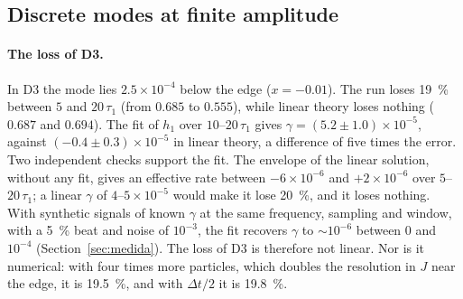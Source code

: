 \documentclass[11pt,a4paper]{article}
\begin{document}
\subsection{Discrete modes at finite amplitude}
\label{sec:res_discreto}

\paragraph{The loss of D3.} In D3 the mode lies $2.5\times10^{-4}$ below the edge
($x=-0.01$). The run loses \SI{19}{\%} between $5$ and $20\,\tau_1$ (from $0.685$ to
$0.555$), while linear theory loses nothing ($0.687$ and $0.694$). The fit of $h_1$ over
$10$--$20\,\tau_1$ gives $\gamma=(5.2\pm1.0)\times10^{-5}$, against $(-0.4\pm0.3)\times10^{-5}$ in
linear theory, a difference of five times the error. Two independent checks support the
fit. The envelope of the linear solution, without any fit, gives an effective rate
between $-6\times10^{-6}$ and $+2\times10^{-6}$ over $5$--$20\,\tau_1$; a linear $\gamma$ of
$4$--$5\times10^{-5}$ would make it lose \SI{20}{\%}, and it loses nothing. With synthetic
signals of known $\gamma$ at the same frequency, sampling and window, with a
\SI{5}{\%} beat and noise of $10^{-3}$, the fit recovers $\gamma$ to $\sim10^{-6}$ between
$0$ and $10^{-4}$ (Section~\ref{sec:medida}). The loss of D3 is therefore not linear.
Nor is it numerical: with four times more particles, which doubles the resolution in $J$
near the edge, it is \SI{19.5}{\%}, and with $\Delta t/2$ it is \SI{19.8}{\%}.
\end{document}
